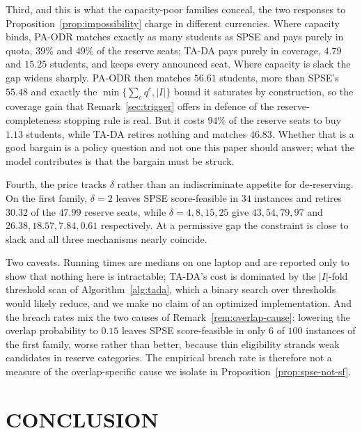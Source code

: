 \documentclass[a4paper,twoside]{article}
\theoremstyle{definition}
\begin{document}
Third, and this is what the capacity-poor families conceal, the two responses to Proposition~\ref{prop:impossibility} charge in different currencies. Where capacity binds, PA-ODR matches exactly as many students as SPSE and pays purely in quota, $39\%$ and $49\%$ of the reserve seats; TA-DA pays purely in coverage, $4.79$ and $15.25$ students, and keeps every announced seat. Where capacity is slack the gap widens sharply. PA-ODR then matches $56.61$ students, more than SPSE's $55.48$ and exactly the $\min\{\sum_c q^c,|I|\}$ bound it saturates by construction, so the coverage gain that Remark~\ref{sec:trigger} offers in defence of the reserve-completeness stopping rule is real. But it costs $94\%$ of the reserve seats to buy $1.13$ students, while TA-DA retires nothing and matches $46.83$. Whether that is a good bargain is a policy question and not one this paper should answer; what the model contributes is that the bargain must be struck.

Fourth, the price tracks $\delta$ rather than an indiscriminate appetite for de-reserving. On the first family, $\delta=2$ leaves SPSE score-feasible in $34$ instances and retires $30.32$ of the $47.99$ reserve seats, while $\delta=4,8,15,25$ give $43,54,79,97$ and $26.38,18.57,7.84,0.61$ respectively. At a permissive gap the constraint is close to slack and all three mechanisms nearly coincide.

Two caveats. Running times are medians on one laptop and are reported only to show that nothing here is intractable; TA-DA's cost is dominated by the $|I|$-fold threshold scan of Algorithm~\ref{alg:tada}, which a binary search over thresholds would likely reduce, and we make no claim of an optimized implementation. And the breach rates mix the two causes of Remark~\ref{rem:overlap-cause}: lowering the overlap probability to $0.15$ leaves SPSE score-feasible in only $6$ of $100$ instances of the first family, worse rather than better, because thin eligibility strands weak candidates in reserve categories. The empirical breach rate is therefore not a measure of the overlap-specific cause we isolate in Proposition~\ref{prop:spse-not-sf}.

\section{\uppercase{Conclusion}}
\end{document}
